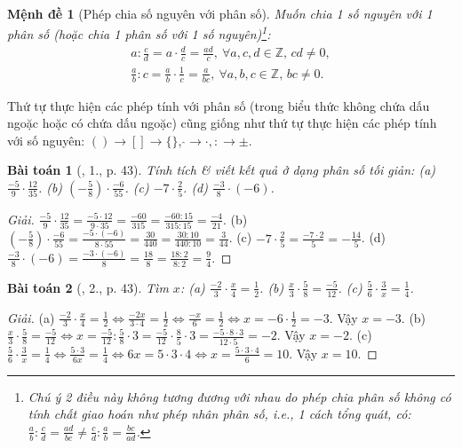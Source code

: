 \documentclass{article}
\newtheorem{baitoan}{Bài toán}
\newtheorem{menhde}{Mệnh đề}
\begin{document}
\begin{menhde}[Phép chia số nguyên với phân số]
	Muốn chia 1 số nguyên với 1 phân số (hoặc chia 1 phân số với 1 số nguyên)\footnote{Chú ý 2 điều này không tương đương với nhau do phép chia phân số không có tính chất giao hoán như phép nhân phân số, i.e., 1 cách tổng quát, có: $\frac{a}{b}:\frac{c}{d} = \frac{ad}{bc}\ne\frac{c}{d}:\frac{a}{b} = \frac{bc}{ad}$.}:
	\begin{align*}
		a:\frac{c}{d} = a\cdot\frac{d}{c} = \frac{ad}{c},\ \forall a,c,d\in\mathbb{Z},\,cd\ne0,\\
		\frac{a}{b}:c = \frac{a}{b}\cdot\frac{1}{c} = \frac{a}{bc},\ \forall a,b,c\in\mathbb{Z},\,bc\ne0.
	\end{align*}
\end{menhde}
Thứ tự thực hiện các phép tính với phân số (trong biểu thức không chứa dấu ngoặc hoặc có chứa dấu ngoặc) cũng giống như thứ tự thực hiện các phép tính với số nguyên: $()\to[]\to\{\}$, $\widehat{}\to\cdot,:\to\pm$.

\begin{baitoan}[\cite{SGK_Toan_6_Canh_Dieu_tap_2}, 1., p. 43]
	Tính tích \& viết kết quả ở dạng phân số tối giản: (a) $\frac{-5}{9}\cdot\frac{12}{35}$. (b) $\left(-\frac{5}{8}\right)\cdot\frac{-6}{55}$. (c) $-7\cdot\frac{2}{5}$. (d) $\frac{-3}{8}\cdot(-6)$.
\end{baitoan}

\begin{proof}[Giải]
	$\frac{-5}{9}\cdot\frac{12}{35} = \frac{-5\cdot12}{9\cdot35} = \frac{-60}{315} = \frac{-60:15}{315:15} = \frac{-4}{21}$. (b) $\left(-\frac{5}{8}\right)\cdot\frac{-6}{55} = \frac{-5\cdot(-6)}{8\cdot55} = \frac{30}{440} = \frac{30:10}{440:10} = \frac{3}{44}$. (c) $-7\cdot\frac{2}{5} = \frac{-7\cdot2}{5} = -\frac{14}{5}$. (d) $\frac{-3}{8}\cdot(-6) = \frac{-3\cdot(-6)}{8} = \frac{18}{8} = \frac{18:2}{8:2} = \frac{9}{4}$.
\end{proof}

\begin{baitoan}[\cite{SGK_Toan_6_Canh_Dieu_tap_2}, 2., p. 43]
	Tìm $x$: (a) $\frac{-2}{3}\cdot\frac{x}{4} = \frac{1}{2}$. (b) $\frac{x}{3}\cdot\frac{5}{8} = \frac{-5}{12}$. (c) $\frac{5}{6}\cdot\frac{3}{x} = \frac{1}{4}$.
\end{baitoan}

\begin{proof}[Giải]
	(a) $\frac{-2}{3}\cdot\frac{x}{4} = \frac{1}{2}\Leftrightarrow\frac{-2x}{3\cdot4} = \frac{1}{2}\Leftrightarrow\frac{-x}{6} = \frac{1}{2}\Leftrightarrow x = -6\cdot\frac{1}{2} = -3$. Vậy $x = -3$. (b) $\frac{x}{3}\cdot\frac{5}{8} = \frac{-5}{12}\Leftrightarrow x = \frac{-5}{12}:\frac{5}{8}\cdot3 = \frac{-5}{12}\cdot\frac{8}{5}\cdot3 = \frac{-5\cdot8\cdot3}{12\cdot5} = -2$. Vậy $x = -2$. (c) $\frac{5}{6}\cdot\frac{3}{x} = \frac{1}{4}\Leftrightarrow\frac{5\cdot3}{6x} = \frac{1}{4}\Leftrightarrow6x = 5\cdot3\cdot4\Leftrightarrow x = \frac{5\cdot3\cdot4}{6} = 10$. Vậy $x = 10$.
\end{proof}
\end{document}
